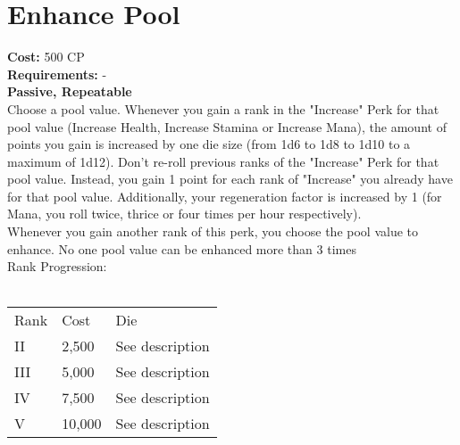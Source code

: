 \section{Enhance Pool}\label{sec:enhancepool}
\textbf{Cost:} 500 CP\\
\textbf{Requirements:} -\\
\textbf{Passive, Repeatable}\\
Choose a pool value.
Whenever you gain a rank in the "Increase" Perk for that pool value (Increase Health, Increase Stamina or Increase Mana), the amount of points you gain is increased by one die size (from 1d6 to 1d8 to 1d10 to a maximum of 1d12).
Don't re-roll previous ranks of the "Increase" Perk for that pool value.
Instead, you gain 1 point for each rank of "Increase" you already have for that pool value.
Additionally, your regeneration factor is increased by 1 (for Mana, you roll twice, thrice or four times per hour respectively).\\
Whenever you gain another rank of this perk, you choose the pool value to enhance.
No one pool value can be enhanced more than 3 times
\\
Rank Progression:\\
\\
\begin{tabular}{l | l | p{12cm} }
    Rank & Cost & Die\\
    II & 2,500 & See description \\
    III & 5,000 & See description \\
    IV & 7,500 & See description\\
    V & 10,000 & See description\\
\end{tabular}